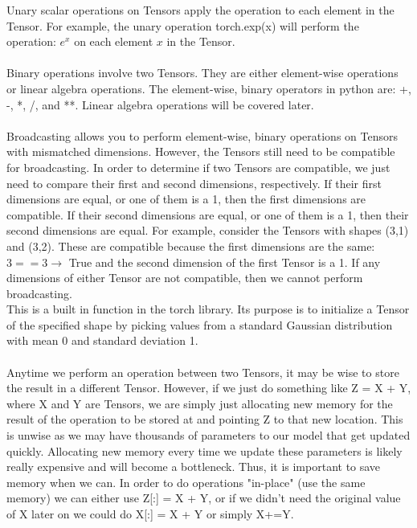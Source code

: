 \documentclass{report}
\begin{document}
Unary scalar operations on Tensors apply the operation to each element in the Tensor. For example, the unary operation torch.exp(x) will perform the operation: $e^x$ on each element $x$ in the Tensor. 
\\

\\

Binary operations involve two Tensors. They are either element-wise operations or linear algebra operations. The element-wise, binary operators in python are: +, -, *, /, and **. Linear algebra operations will be covered later.
\\

\\

Broadcasting allows you to perform element-wise, binary operations on Tensors with mismatched dimensions. However, the Tensors still need to be compatible for broadcasting. In order to determine if two Tensors are compatible, we just need to compare their first and second dimensions, respectively. If their first dimensions are equal, or one of them is a 1, then the first dimensions are compatible. If their second dimensions are equal, or one of them is a 1, then their second dimensions are equal. For example, consider the Tensors with shapes (3,1) and (3,2). These are compatible because the first dimensions are the same: $3 == 3 \rightarrow$ True and the second dimension of the first Tensor is a 1. If any dimensions of either Tensor are not compatible, then we cannot perform broadcasting. 
\\

This is a built in function in the torch library. Its purpose is to initialize a Tensor of the specified shape by picking values from a standard Gaussian distribution with mean 0 and standard deviation 1.
\\

\\

Anytime we perform an operation between two Tensors, it may be wise to store the result in a different Tensor. However, if we just do something like Z = X + Y, where X and Y are Tensors, we are simply just allocating new memory for the result of the operation to be stored at and pointing Z to that new location. This is unwise as we may have thousands of parameters to our model that get updated quickly. Allocating new memory every time we update these parameters is likely really expensive and will become a bottleneck. Thus, it is important to save memory when we can. In order to do operations "in-place" (use the same memory) we can either use Z[:] = X + Y, or if we didn't need the original value of X later on we could do X[:] = X + Y or simply X+=Y.
\end{document}
